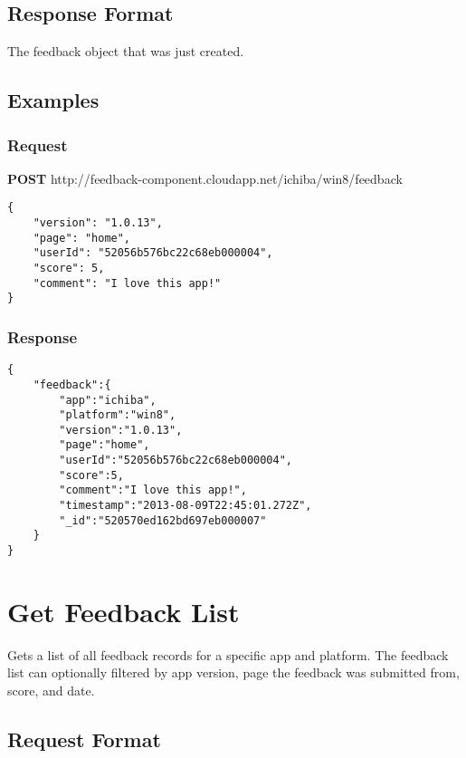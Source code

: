 \subsection{Response Format}

The feedback object that was just created.

\subsection{Examples}

\subsubsection{Request}

\textbf{POST} http://feedback-component.cloudapp.net/ichiba/win8/feedback
\begin{verbatim}
{
    "version": "1.0.13",
    "page": "home",
    "userId": "52056b576bc22c68eb000004",
    "score": 5,
    "comment": "I love this app!"
}
\end{verbatim}

\subsubsection{Response}
\begin{verbatim}
{
    "feedback":{
        "app":"ichiba",
        "platform":"win8",
        "version":"1.0.13",
        "page":"home",
        "userId":"52056b576bc22c68eb000004",
        "score":5,
        "comment":"I love this app!",
        "timestamp":"2013-08-09T22:45:01.272Z",
        "_id":"520570ed162bd697eb000007"
    }
}
\end{verbatim}


\section{Get Feedback List}

Gets a list of all feedback records for a specific app and platform. The
feedback list can optionally filtered by app version, page the feedback was
submitted from, score, and date.

\subsection{Request Format}

